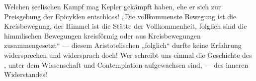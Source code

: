 Welchen seelischen Kampf mag Kepler gekämpft haben, ehe er sich zur Preisgebung der Epicyklen entschloss! „Die vollkommenste Bewegung ist die Kreisbewegung, der Himmel ist die Stätte der Vollkommenheit, folglich sind die himmlischen Bewegungen kreisförmig oder aus Kreisbewegungen zusammengesetzt“ — diesem Aristotelischen „folglich“ durfte keine Erfahrung widersprechen und widersprach doch! Wer schreibt uns einmal die Geschichte des  , unter dem Wissenschaft und Contemplation aufgewachsen sind, — des  inneren Widerstandes!
\par

